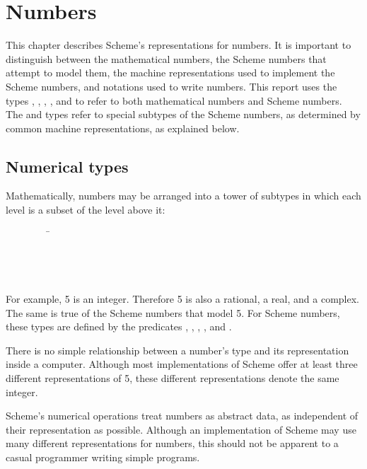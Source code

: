 \chapter{Numbers}
\label{numbertypeschapter}

This chapter describes Scheme's representations for numbers.
It is important to distinguish between the mathematical numbers, the
Scheme numbers that attempt to model them, the machine representations
used to implement the Scheme numbers, and notations used to write numbers.
This report uses the types , , ,
, and  to refer to both mathematical numbers
and Scheme numbers.
The  and  types refer to special
subtypes of the Scheme numbers, as determined by common machine
representations, as explained below.

\section{Numerical types}
\label{numericaltypes}

\vest Mathematically, numbers may be arranged into a tower of subtypes
in which each level is a subset of the level above it:
\begin{tabbing}
\ \ \ \ \ \ \ \ \ \= \\
\>  \\
\>  \\
\>  \\
\>  
\end{tabbing}

For example, 5 is an integer.  Therefore 5 is also a rational,
a real, and a complex.  The same is true of the Scheme numbers
that model 5.  For Scheme numbers, these types are defined by the
predicates , , , ,
and .

There is no simple relationship between a number's type and its
representation inside a computer.  Although most implementations of
Scheme offer at least three different representations of 5, these
different representations denote the same integer.

Scheme's numerical operations treat numbers as abstract data, as
independent of their representation as possible.  Although an implementation
of Scheme may use many different representations for
numbers, this should not be apparent to a casual programmer writing
simple programs.

